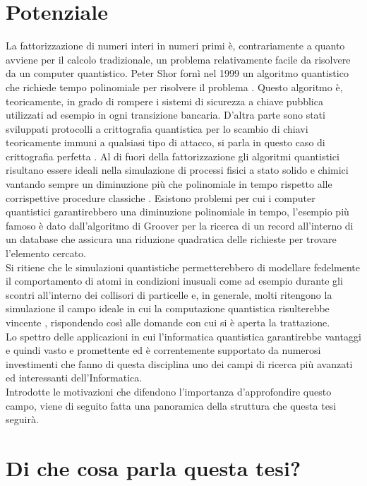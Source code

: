 \documentclass[12pt,a4paper,openright]{report}
\begin{document}
\section{Potenziale}
La fattorizzazione di numeri interi in numeri primi è, contrariamente a quanto avviene per il calcolo tradizionale, un problema relativamente facile da risolvere da un computer quantistico.
Peter Shor fornì nel 1999 un algoritmo quantistico che richiede tempo polinomiale per risolvere il problema \cite{ref25}. Questo algoritmo è, teoricamente, in grado di rompere i sistemi di sicurezza a
chiave pubblica utilizzati ad esempio in ogni transizione bancaria. D'altra parte sono stati sviluppati protocolli a crittografia quantistica per lo scambio di chiavi teoricamente immuni a qualsiasi tipo di 
attacco, si parla in questo caso di crittografia perfetta \cite{ref26}. Al di fuori della fattorizzazione gli algoritmi quantistici risultano essere ideali nella simulazione di processi fisici a stato solido e chimici
vantando sempre un diminuzione più che polinomiale in tempo rispetto alle corrispettive procedure classiche \cite{ref27}. Esistono problemi per cui i computer quantistici garantirebbero una diminuzione polinomiale 
in tempo, l'esempio più famoso è dato dall'algoritmo di Groover \cite{ref28} per la ricerca di un record all'interno di un database che assicura una riduzione quadratica delle richieste per trovare l'elemento cercato.\\
Si ritiene che le simulazioni quantistiche permetterebbero di modellare fedelmente il comportamento di atomi in condizioni inusuali come ad esempio durante gli scontri all'interno dei collisori di particelle \cite{ref29} e,
in generale, molti ritengono la simulazione il campo ideale in cui la computazione quantistica risulterebbe vincente \cite{ref30}, rispondendo così alle domande con cui si è aperta la trattazione.\\
Lo spettro delle applicazioni in cui l'informatica quantistica garantirebbe vantaggi e quindi vasto e promettente ed è correntemente supportato da numerosi investimenti che fanno di questa disciplina uno dei 
campi di ricerca più avanzati ed interessanti dell'Informatica.\\
Introdotte le motivazioni che difendono l'importanza d'approfondire questo campo, viene di seguito fatta una panoramica della struttura che questa tesi seguirà.

\section{Di che cosa parla questa tesi?}
\end{document}
